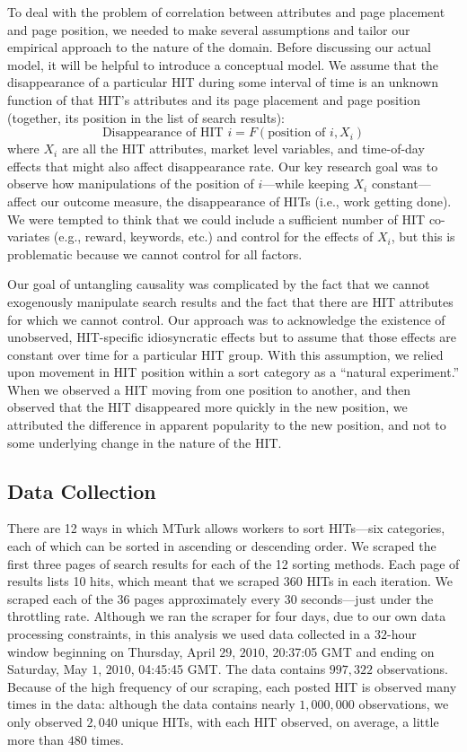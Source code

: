 \documentclass{sig-alternate}
\begin{document}
To deal with the problem of correlation between attributes and page
placement and page position, we needed to make several assumptions and
tailor our empirical approach to the nature of the domain.  Before
discussing our actual model, it will be helpful to introduce a
conceptual model.  We assume that the disappearance of a particular
HIT during some interval of time is an unknown function of that HIT's
attributes and its page placement and page position (together, its
position in the list of search results):
\[
\mbox{Disappearance of HIT $i$} = F(\mbox{position of $i$},X_i)
\]
where $X_i$ are all the HIT attributes, market level variables, and
time-of-day effects that might also affect disappearance rate.  Our key
research goal was to observe how manipulations of the position of
$i$---while keeping $X_i$ constant---affect our outcome measure,
the disappearance of HITs (i.e., work getting done).  We were
tempted to think that we could include a sufficient number of HIT
co-variates (e.g., reward, keywords, etc.) and control for the effects of
$X_i$, but this is problematic because we cannot control for all factors. 

Our goal of untangling causality was complicated by the fact that we
cannot exogenously manipulate search results and the fact that there
are HIT attributes for which we cannot control.  Our approach was to
acknowledge the existence of unobserved, HIT-specific idiosyncratic
effects but to assume that those effects are constant over time for a
particular HIT group. With this assumption, we relied upon movement in
HIT position within a sort category as a ``natural experiment.''  When
we observed a HIT moving from one position to another, and then
observed that the HIT disappeared more quickly in the new position, we
attributed the difference in apparent popularity to the new position,
and not to some underlying change in the nature of the HIT.

\subsection{Data Collection}
There are 12 ways in which MTurk allows workers to sort HITs---six
categories, each of which can be sorted in ascending or descending order.
We scraped the first three pages of search results for each of the 12
sorting methods.  Each page of results lists 10 hits, which meant that
we scraped $360$ HITs in each iteration.  We scraped each of the $36$
pages approximately every $30$ seconds---just under the throttling
rate. Although we ran the scraper for four days, due to our own data
processing constraints, in this analysis we used data collected in a
$32$-hour window beginning on Thursday, April $29$, $2010$, 20:37:05
GMT and ending on Saturday, May $1$, $2010$, 04:45:45 GMT.  The data
contains $997,322$ observations. Because of the high frequency of our
scraping, each posted HIT is observed many times in the data: although
the data contains nearly $1,000,000$ observations, we only observed
$2,040$ unique HITs, with each HIT observed, on average, a little more
than $480$ times.
\end{document}
